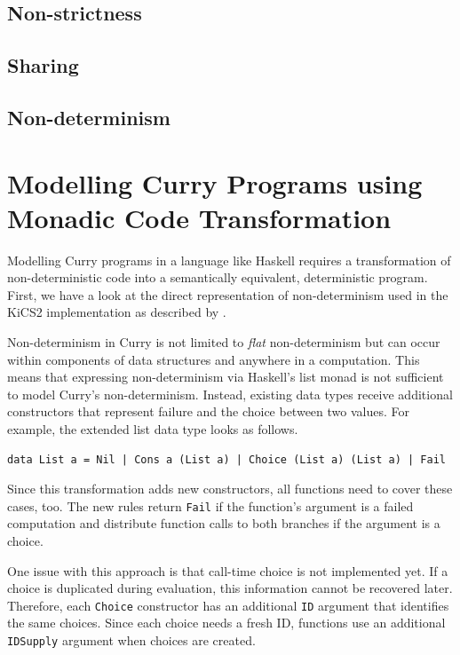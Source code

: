 \documentclass[a4paper, 11pt, fleqn, twoside]{scrreprt}
\newcommand{\todo}[1]{\marginpar{\textbf{TODO:} #1}}
\begin{document}
\subsection{Non-strictness}
\subsection{Sharing}
\subsection{Non-determinism}

\section{Modelling Curry Programs using Monadic Code Transformation}
Modelling Curry programs in a language like Haskell requires a transformation 
of non-deterministic code into a semantically equivalent, deterministic 
program. First, we have a look at the direct representation of non-determinism 
used in the KiCS2 implementation as described by \citet{KiCS2-NewCompiler}.

Non-determinism in Curry is not limited to \textit{flat} non-determinism but 
can occur within components of data structures and anywhere in a computation. 
This means that expressing non-determinism via Haskell's list monad is not 
sufficient to model Curry's non-determinism. \todo{Example}
Instead, existing data types receive additional constructors that represent 
failure and the choice between two values. For example, the extended list data 
type looks as follows.

\begin{verbatim}
data List a = Nil | Cons a (List a) | Choice (List a) (List a) | Fail
\end{verbatim}

Since this transformation adds new constructors, all functions need to cover 
these cases, too. The new rules return \texttt{Fail} if the 
function's argument is a failed computation and distribute function calls to 
both branches if the argument is a choice.

One issue with this approach is that call-time choice is not implemented yet. 
If a choice is duplicated during evaluation, this information cannot be 
recovered later. Therefore, each \texttt{Choice} constructor has 
an additional \texttt{ID} argument that identifies the same 
choices. Since each choice needs a fresh ID, functions use an additional 
\texttt{IDSupply} argument when choices are created.
\end{document}
